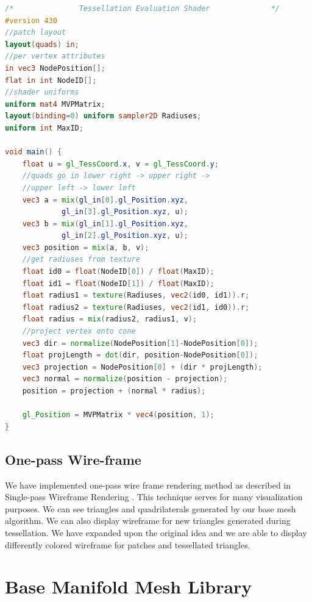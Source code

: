 \linespread{1.2}
\begin{lstlisting}[language=GLSL,caption={Tessellation evaluation shader projecting tessellated vertices onto truncated cone.},label={lst:tess_proj}]
/*               Tessellation Evaluation Shader              */ 
#version 430
//patch layout
layout(quads) in;
//per vertex attributes
in vec3 NodePosition[];
flat in int NodeID[];
//shader uniforms
uniform mat4 MVPMatrix;
layout(binding=0) uniform sampler2D Radiuses;
uniform int MaxID;

void main() {
    float u = gl_TessCoord.x, v = gl_TessCoord.y;
	//quads go in lower right -> upper right ->
	//upper left -> lower left
	vec3 a = mix(gl_in[0].gl_Position.xyz,
		     gl_in[3].gl_Position.xyz, u);
	vec3 b = mix(gl_in[1].gl_Position.xyz,
		     gl_in[2].gl_Position.xyz, u);
	vec3 position = mix(a, b, v);
	//get radiuses from texture
	float id0 = float(NodeID[0]) / float(MaxID);
	float id1 = float(NodeID[1]) / float(MaxID);
	float radius1 = texture(Radiuses, vec2(id0, id1)).r;
	float radius2 = texture(Radiuses, vec2(id1, id0)).r;
	float radius = mix(radius2, radius1, v);
	//project vertex onto cone
	vec3 dir = normalize(NodePosition[1]-NodePosition[0]);
	float projLength = dot(dir, position-NodePosition[0]);
	vec3 projection = NodePosition[0] + (dir * projLength);
	vec3 normal = normalize(position - projection);
	position = projection + (normal * radius);

	gl_Position = MVPMatrix * vec4(position, 1);
}
\end{lstlisting} 
\linespread{1.5}

\subsection{One-pass Wire-frame}

We have implemented one-pass wire frame rendering method as described in Single-pass Wireframe Rendering \cite{wireframe}.
This technique serves for many visualization purposes.
We can see triangles and quadrilaterals generated by our base mesh algorithm.
We can also display wireframe for new triangles generated during tessellation.
We have expanded upon the original idea and we are able to display differently colored wireframe for patches and tessellated triangles.

\section{Base Manifold Mesh Library}

